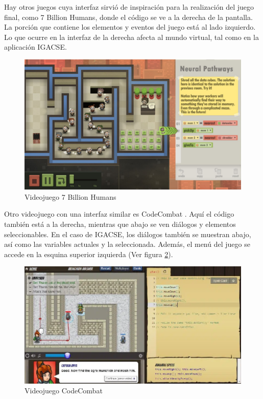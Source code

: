 Hay otros juegos cuya interfaz sirvió de inspiración para la realización del juego final, como 7 Billion Humans\cite{7billionhumans}, donde el código se ve a la derecha de la pantalla. La porción que contiene los elementos y eventos del juego está al lado izquierdo. Lo que ocurre en la interfaz de la derecha afecta al mundo virtual, tal como en la aplicación IGACSE.

\begin{figure}[h]
	\centering
	\includegraphics[scale=0.3]{imagenes/7BillionHumans.png}
	\caption{Videojuego 7 Billion Humans}
	\label{7BillionHumans}
\end{figure}


Otro videojuego con una interfaz similar es CodeCombat \cite{CodeCombat}. Aquí el código también está a la derecha, mientras que abajo se ven diálogos y elementos seleccionables. En el caso de IGACSE, los diálogos también se muestran abajo, así como las variables actuales y la seleccionada.
Además, el menú del juego se accede en la esquina superior izquierda (Ver figura \ref{CodeCombat}).

\begin{figure}[!h]
	\centering
	\includegraphics[scale=0.3]{imagenes/CodeCombat.png}
	\caption{Videojuego CodeCombat}
	\label{CodeCombat}
\end{figure}


